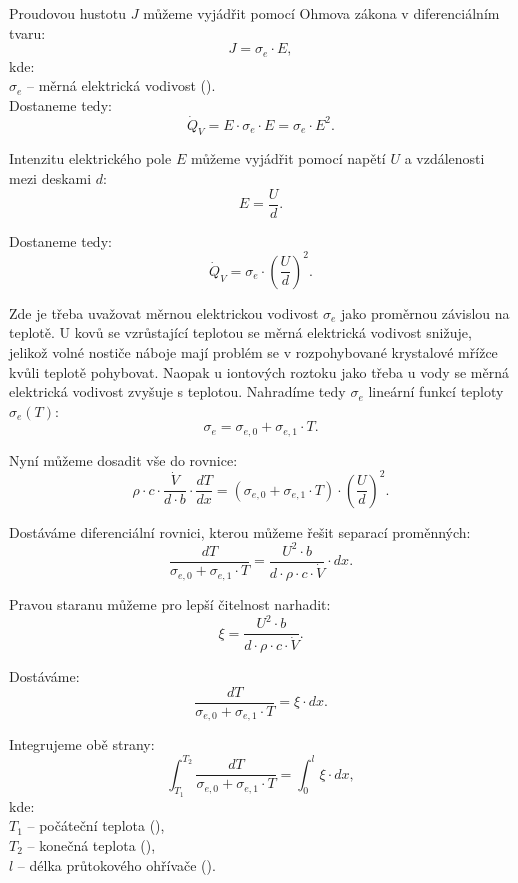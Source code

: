 \documentclass{article}
\begin{document}
Proudovou hustotu $J$ můžeme vyjádřit pomocí Ohmova zákona v diferenciálním tvaru:
$$
    J = \sigma_e \cdot E,
$$
kde:\\
$\sigma_e$ -- měrná elektrická vodivost (\ueqOHMandMinv).\\

Dostaneme tedy:
$$
    \dot{Q}_V = E \cdot \sigma_e \cdot E = \sigma_e \cdot E^2.
$$

Intenzitu elektrického pole $E$ můžeme vyjádřit pomocí napětí $U$ a vzdálenosti mezi deskami $d$:
$$
    E = \frac{U}{d}.
$$

Dostaneme tedy:
$$
    \dot{Q}_V = \sigma_e \cdot \left( \frac{U}{d} \right)^2.
$$

Zde je třeba uvažovat měrnou elektrickou vodivost $\sigma_e$ jako proměrnou závislou na teplotě. U kovů se vzrůstající teplotou se měrná elektrická vodivost snižuje, jelikož volné nostiče náboje mají problém se v rozpohybované krystalové mřížce kvůli teplotě pohybovat. Naopak u iontových roztoku jako třeba u vody se měrná elektrická vodivost zvyšuje s teplotou. Nahradíme tedy $\sigma_e$ lineární funkcí teploty $\sigma_e(T)$:
$$
    \sigma_e = \sigma_{e,0} + \sigma_{e,1} \cdot T.
$$

Nyní můžeme dosadit vše do rovnice:
$$
    \rho \cdot c \cdot \frac{\dot{V}}{d \cdot b} \cdot \frac{dT}{dx} = \left( \sigma_{e,0} + \sigma_{e,1} \cdot T \right) \cdot \left( \frac{U}{d} \right)^2.
$$

Dostáváme diferenciální rovnici, kterou můžeme řešit separací proměnných:
$$
    \frac{dT}{\sigma_{e,0} + \sigma_{e,1} \cdot T} = \frac{U^2 \cdot b}{d \cdot \rho \cdot c \cdot \dot{V}} \cdot dx.
$$

Pravou staranu můžeme pro lepší čitelnost narhadit:
$$
    \xi = \frac{U^2 \cdot b}{d \cdot \rho \cdot c \cdot \dot{V}}.
$$

Dostáváme:
$$
    \frac{dT}{\sigma_{e,0} + \sigma_{e,1} \cdot T} = \xi \cdot dx.
$$

Integrujeme obě strany:
$$
    \int_{T_1}^{T_2} \frac{dT}{\sigma_{e,0} + \sigma_{e,1} \cdot T} = \int_{0}^{l} \xi \cdot dx,
$$
kde:\\
$T_1$ -- počáteční teplota (\ueqK),\\
$T_2$ -- konečná teplota (\ueqK),\\
$l$ -- délka průtokového ohřívače (\ueqM).\\
\end{document}
